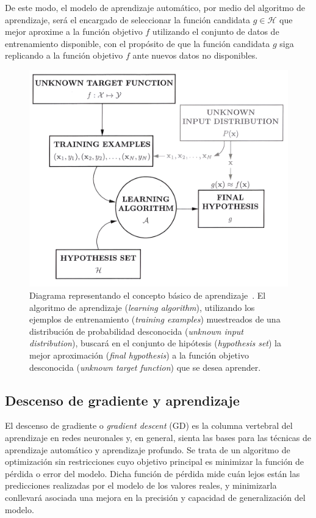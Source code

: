 De este modo, el modelo de aprendizaje automático, por medio del algoritmo de aprendizaje, será el encargado de seleccionar la función candidata $g \in \mathcal{H}$ que mejor aproxime a la función objetivo $f$ utilizando el conjunto de datos de entrenamiento disponible, con el propósito de que la función candidata $g$ siga replicando a la función objetivo $f$ ante nuevos datos no disponibles.\newline

\begin{figure}[h]
    \centering
    \includegraphics[width=0.7\linewidth]{img/learning-diagram.png}
    \caption[Diagrama representando el concepto básico de aprendizaje.]{Diagrama representando el concepto básico de aprendizaje~\cite{Mostafa2012}. El algoritmo de aprendizaje (\textit{learning algorithm}), utilizando los ejemplos de entrenamiento (\textit{training examples}) muestreados de una distribución de probabilidad desconocida (\textit{unknown input distribution}), buscará en el conjunto de hipótesis (\textit{hypothesis set}) la mejor aproximación (\textit{final hypothesis}) a la función objetivo desconocida (\textit{unknown target function}) que se desea aprender.}\label{fig:learning-diagram}
\end{figure}

\subsection{Descenso de gradiente y aprendizaje}\label{subsec:descenso-gradiente}

El descenso de gradiente o \emph{gradient descent} (GD) es la columna vertebral del aprendizaje en redes neuronales y, en general, sienta las bases para las técnicas de aprendizaje automático y aprendizaje profundo. Se trata de un algoritmo de optimización sin restricciones cuyo objetivo principal es minimizar la función de pérdida o error del modelo. Dicha función de pérdida mide cuán lejos están las predicciones realizadas por el modelo de los valores reales, y minimizarla conllevará asociada una mejora en la precisión y capacidad de generalización del modelo.\newline

